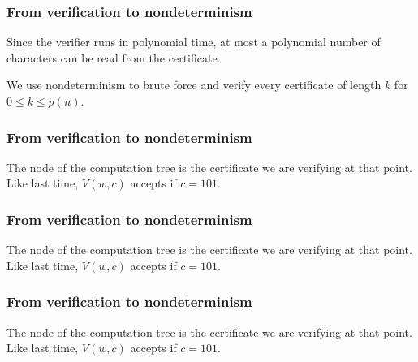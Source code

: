 \documentclass[aspectratio=169]{beamer}
\begin{document}
\begin{frame}
\frametitle{From verification to nondeterminism}
Since the verifier runs in polynomial time, at most a polynomial number of characters can be read from the certificate.

We use nondeterminism to brute force and verify every certificate of length $k$ for $0 \leq k \leq p(n)$.
\end{frame}

\begin{frame}
\frametitle{From verification to nondeterminism}

The node of the computation tree is the certificate we are verifying at that point. Like last time, $V(w, c)$ accepts if $c = 101$.
\begin{center}
\end{center}
\end{frame}

\begin{frame}[noframenumbering]
\frametitle{From verification to nondeterminism}

The node of the computation tree is the certificate we are verifying at that point. Like last time, $V(w, c)$ accepts if $c = 101$.
\begin{center}
\end{center}
\end{frame}

\begin{frame}[noframenumbering]
\frametitle{From verification to nondeterminism}

The node of the computation tree is the certificate we are verifying at that point. Like last time, $V(w, c)$ accepts if $c = 101$.
\begin{center}
\end{center}
\end{frame}
\end{document}
